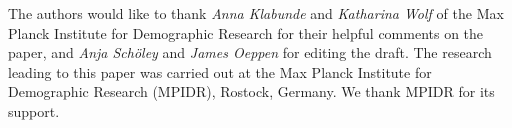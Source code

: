 \documentclass[parskip=half]{scrartcl}
\begin{document}
The authors would like to thank \emph{Anna Klabunde} and \emph{Katharina Wolf} of the Max Planck Institute for Demographic Research for their helpful comments on the paper, and \emph{Anja Schöley} and \emph{James Oeppen} for editing the draft. The research leading to this paper was carried out at the Max Planck Institute for Demographic Research (MPIDR), Rostock, Germany. We thank MPIDR for its support. 

\clearpage


\sloppy
\printbibliography

\clearpage


\renewcommand\thefigure{\thesection.\arabic{figure}}
\setcounter{figure}{0}
\end{document}
